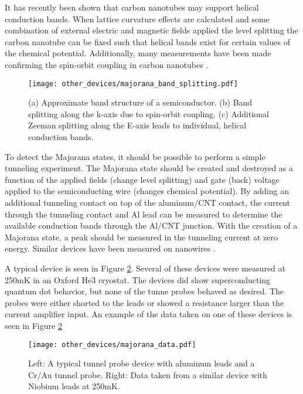 It has recently been shown that carbon nanotubes may support helical conduction bands\cite{Klinovaja2011a, Klinovaja2011}.  When lattice curvature effects are calculated and some combination of external electric and magnetic fields applied the level splitting the carbon nanotube can be fixed such that helical bands exist for certain values of the chemical potential. Additionally, many measurements have been made confirming the spin-orbit coupling in carbon nanotubes \cite{Kuemmeth2008, Jespersen2011, Steele2013 ,Lai2014}.

\begin{figure}
    \centering
    \texttt{[image: other\_devices/majorana\_band\_splitting.pdf]}
    \caption{(a) Approximate band structure of a semiconductor. (b) Band splitting along the k-axis due to spin-orbit coupling. (c) Additional Zeeman splitting along the E-axis leads to individual, helical conduction bands.}
    \label{fig:band_splitting}
\end{figure}

To detect the Majorana states, it should be possible to perform a simple tunneling experiment. The Majorana state should be created and destroyed as a function of the applied fields (change level splitting) and gate (back) voltage applied to the semiconducting wire (changes chemical potential). By adding an additional tunneling contact on top of the aluminum/CNT contact, the current through the tunneling contact and Al lead can be measured to determine the available conduction bands through the Al/CNT junction. With the creation of a Majorana state, a peak should be measured in the tunneling current at zero energy. Similar devices have been measured on  nanowires \cite{Mourik2012}. 

A typical device is seen in Figure \ref{fig:majorana_data}. Several of these devices were measured at 250mK in an Oxford He3 cryostat. The devices did show superconducting quantum dot behavior, but none of the tunne probes behaved as desired. The probes were either shorted to the leads or showed a resistance larger than the current amplifier input. An example of the data taken on one of these devices is seen in Figure \ref{fig:majorana_data}

\begin{figure}
    \centering
    \texttt{[image: other\_devices/majorana\_data.pdf]}
    \caption{Left: A typical tunnel probe device with aluminum leads and a Cr/Au tunnel probe. Right: Data taken from a similar device with Niobium leads at 250mK.}
    \label{fig:majorana_data}
\end{figure}

